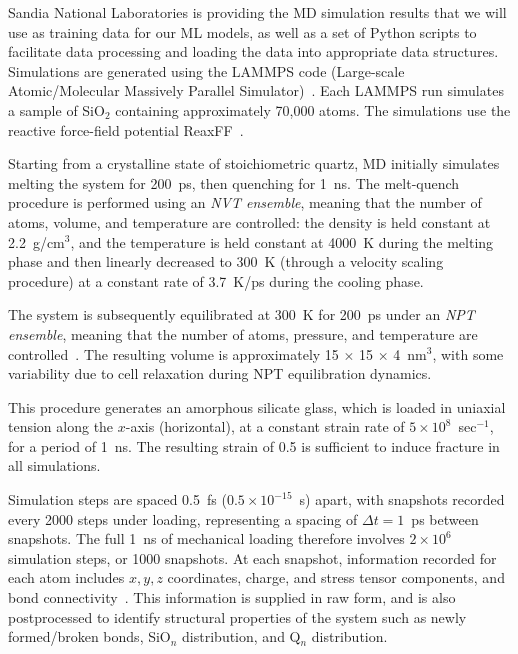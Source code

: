 
Sandia National Laboratories is providing the MD simulation results that we will use as training data for our ML models, as well as a set of Python scripts to facilitate data processing and loading the data into appropriate data structures. Simulations are generated using the LAMMPS code (Large-scale Atomic/Molecular Massively Parallel Simulator)~\cite{PAMD}.  Each LAMMPS run simulates a sample of SiO$_2$ containing approximately 70,000 atoms. The simulations use the reactive force-field potential ReaxFF~\cite{pitman2012dynamics}.

Starting from a crystalline state of stoichiometric quartz, MD initially simulates melting the system for 200~ps, then quenching for 1~ns. The melt-quench procedure is performed using an \emph{NVT ensemble}, meaning that the number of atoms, volume, and temperature are controlled: the density is held constant at 2.2~g/cm$^3$, and the temperature is held constant at 4000~K during the melting phase and then linearly decreased to 300~K (through a velocity scaling procedure) at a constant rate of 3.7~K/ps during the cooling phase.

The system is subsequently equilibrated at 300~K for 200~ps under an \emph{NPT ensemble}, meaning that the number of atoms, pressure, and temperature are controlled~\cite{markpres}. The resulting volume is approximately 15 $\times$ 15 $\times$ 4~nm$^3$, with some variability due to cell relaxation during NPT equilibration dynamics.

This procedure generates an amorphous silicate glass, which is loaded in uniaxial tension along the $x$-axis (horizontal), at a constant strain rate of $5\times 10^8$~sec$^{-1}$, for a period of 1~ns.  The resulting strain of 0.5 is sufficient to induce fracture in all simulations. %

Simulation steps are spaced 0.5~fs ($0.5 \times 10^{-15}$~s) apart, with snapshots recorded every 2000 steps under loading, representing a spacing of $\Delta t = 1$~ps between snapshots.  The full 1~ns of mechanical loading therefore involves $2 \times 10^6$ simulation steps, or 1000 snapshots. At each snapshot, information recorded for each atom includes $x,y,z$ coordinates, charge, and stress tensor components, and bond connectivity~\cite{markpres}.  This information is supplied in raw form, and is also postprocessed to identify structural properties of the system such as newly formed/broken bonds, SiO$_n$ distribution, and Q$_n$ distribution.

